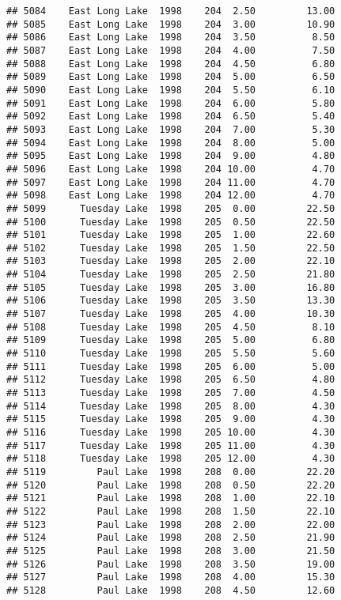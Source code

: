 \documentclass[
]{article}
\begin{document}
\begin{verbatim}
## 5084    East Long Lake  1998    204  2.50         13.00
## 5085    East Long Lake  1998    204  3.00         10.90
## 5086    East Long Lake  1998    204  3.50          8.50
## 5087    East Long Lake  1998    204  4.00          7.50
## 5088    East Long Lake  1998    204  4.50          6.80
## 5089    East Long Lake  1998    204  5.00          6.50
## 5090    East Long Lake  1998    204  5.50          6.10
## 5091    East Long Lake  1998    204  6.00          5.80
## 5092    East Long Lake  1998    204  6.50          5.40
## 5093    East Long Lake  1998    204  7.00          5.30
## 5094    East Long Lake  1998    204  8.00          5.00
## 5095    East Long Lake  1998    204  9.00          4.80
## 5096    East Long Lake  1998    204 10.00          4.70
## 5097    East Long Lake  1998    204 11.00          4.70
## 5098    East Long Lake  1998    204 12.00          4.70
## 5099      Tuesday Lake  1998    205  0.00         22.50
## 5100      Tuesday Lake  1998    205  0.50         22.50
## 5101      Tuesday Lake  1998    205  1.00         22.60
## 5102      Tuesday Lake  1998    205  1.50         22.50
## 5103      Tuesday Lake  1998    205  2.00         22.10
## 5104      Tuesday Lake  1998    205  2.50         21.80
## 5105      Tuesday Lake  1998    205  3.00         16.80
## 5106      Tuesday Lake  1998    205  3.50         13.30
## 5107      Tuesday Lake  1998    205  4.00         10.30
## 5108      Tuesday Lake  1998    205  4.50          8.10
## 5109      Tuesday Lake  1998    205  5.00          6.80
## 5110      Tuesday Lake  1998    205  5.50          5.60
## 5111      Tuesday Lake  1998    205  6.00          5.00
## 5112      Tuesday Lake  1998    205  6.50          4.80
## 5113      Tuesday Lake  1998    205  7.00          4.50
## 5114      Tuesday Lake  1998    205  8.00          4.30
## 5115      Tuesday Lake  1998    205  9.00          4.30
## 5116      Tuesday Lake  1998    205 10.00          4.30
## 5117      Tuesday Lake  1998    205 11.00          4.30
## 5118      Tuesday Lake  1998    205 12.00          4.30
## 5119         Paul Lake  1998    208  0.00         22.20
## 5120         Paul Lake  1998    208  0.50         22.20
## 5121         Paul Lake  1998    208  1.00         22.10
## 5122         Paul Lake  1998    208  1.50         22.10
## 5123         Paul Lake  1998    208  2.00         22.00
## 5124         Paul Lake  1998    208  2.50         21.90
## 5125         Paul Lake  1998    208  3.00         21.50
## 5126         Paul Lake  1998    208  3.50         19.00
## 5127         Paul Lake  1998    208  4.00         15.30
## 5128         Paul Lake  1998    208  4.50         12.60

\end{verbatim}
\end{document}
